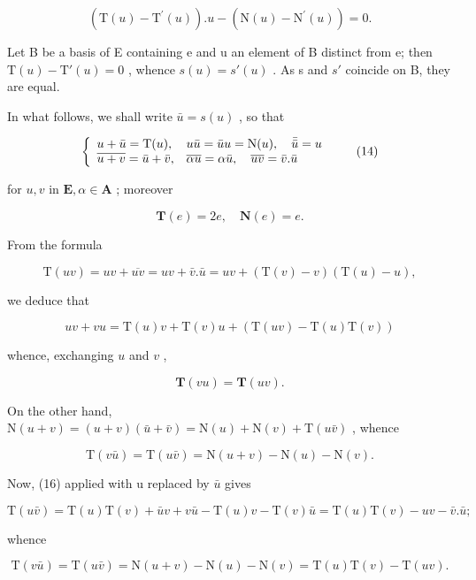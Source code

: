 \[
(\mathrm{T} (u) - \mathrm{T} ^ {\prime} (u)). u - (\mathrm{N} (u) - \mathrm{N} ^ {\prime} (u)) = 0.
\]

Let B be a basis of E containing e and u an element of B distinct from e; then \(\mathrm{T}(u) - \mathrm{T}'(u) = 0\) , whence \(s(u) = s'(u)\) . As s and \(s'\) coincide on B, they are equal.

In what follows, we shall write \(\bar{u} = s(u)\) , so that

\[
\left\{ \begin{array}{l l} u + \bar {u} = \mathrm{T} (u), & u \bar {u} = \bar {u} u = \mathrm{N} (u), \quad \bar {\bar {u}} = u \\ \overline {{u + v}} = \bar {u} + \bar {v}, & \overline {{\alpha u}} = \alpha \bar {u}, \quad \overline {{u v}} = \bar {v}. \bar {u} \end{array} \right.\tag{14}
\]

for \(u, v\) in \(\mathbf{E}, \alpha \in \mathbf{A}\) ; moreover

\[
\mathbf {T} (e) = 2 e, \quad \mathbf {N} (e) = e.\tag{15}
\]

From the formula

\[
\mathrm{T} (u v) = u v + \overline {{{{u v}}}} = u v + \bar {v}. \bar {u} = u v + (\mathrm{T} (v) - v) (\mathrm{T} (u) - u),
\]

we deduce that

\[
u v + v u = \mathrm{T} (u) v + \mathrm{T} (v) u + (\mathrm{T} (u v) - \mathrm{T} (u) \mathrm{T} (v))\tag{16}
\]

whence, exchanging \(u\) and \(v\) ,

\[
\mathbf {T} (v u) = \mathbf {T} (u v).\tag{17}
\]

On the other hand, \(\mathrm{N}(u+v)=(u+v)(\bar{u}+\bar{v})=\mathrm{N}(u)+\mathrm{N}(v)+\mathrm{T}(u\bar{v})\) , whence

\[
\mathrm{T} (v \bar {u}) = \mathrm{T} (u \bar {v}) = \mathrm{N} (u + v) - \mathrm{N} (u) - \mathrm{N} (v).\tag{18}
\]

Now, (16) applied with u replaced by \(\bar{u}\) gives

\[
\mathrm{T} (u \bar {v}) = \mathrm{T} (u) \mathrm{T} (v) + \bar {u} v + v \bar {u} - \mathrm{T} (u) v - \mathrm{T} (v) \bar {u} = \mathrm{T} (u) \mathrm{T} (v) - u v - \bar {v}. \bar {u};
\]

whence

\[
\mathrm{T} (v \bar {u}) = \mathrm{T} (u \bar {v}) = \mathrm{N} (u + v) - \mathrm{N} (u) - \mathrm{N} (v) = \mathrm{T} (u) \mathrm{T} (v) - \mathrm{T} (u v).\tag{19}
\]

